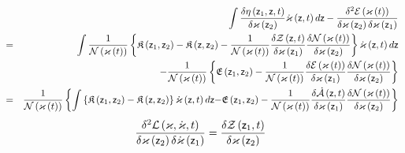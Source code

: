\begin{eqnarray}
&&\int \frac{\delta \eta \left( {\sf z}_{1},{\sf z},t\right) }{\delta
\varkappa \left( {\sf z}_{2}\right) }{\cal \dot{\varkappa}}\left( {\sf z}%
,t\right) d{\sf z}-\frac{\delta ^{2}{\cal E}\left( {\cal \varkappa }\left(
t\right) \right) }{\delta \varkappa \left( {\sf z}_{2}\right) \delta
\varkappa \left( {\sf z}_{1}\right) } \\
&=&\int \frac{1}{{\cal N}\left( {\cal \varkappa }\left( t\right) \right) }%
\left\{ {\frak K}\left( {\sf z}_{1},{\sf z}_{2}\right) -{\frak K}\left( {\sf %
z},{\sf z}_{2}\right) -\frac{1}{{\cal N}\left( {\cal \varkappa }\left(
t\right) \right) }\frac{\delta {\cal Z}\left( {\sf z},t\right) }{\delta
\varkappa \left( {\sf z}_{1}\right) }\frac{\delta {\cal N}\left( {\cal %
\varkappa }\left( t\right) \right) }{\delta \varkappa \left( {\sf z}%
_{2}\right) }\right\} {\cal \dot{\varkappa}}\left( {\sf z},t\right) d{\sf z}
\\
&&-\frac{1}{{\cal N}\left( {\cal \varkappa }\left( t\right) \right) }\left\{ 
{\frak E}\left( {\sf z}_{1},{\sf z}_{2}\right) -\frac{1}{{\cal N}\left( 
{\cal \varkappa }\left( t\right) \right) }\frac{\delta {\cal E}\left(
\varkappa \left( t\right) \right) }{\delta \varkappa \left( {\sf z}%
_{1}\right) }\frac{\delta {\cal N}\left( \varkappa \left( t\right) \right) }{%
\delta \varkappa \left( {\sf z}_{2}\right) }\right\} \\
&=&\frac{1}{{\cal N}\left( {\cal \varkappa }\left( t\right) \right) }\left\{
\int \left\{ {\frak K}\left( {\sf z}_{1},{\sf z}_{2}\right) -{\frak K}\left( 
{\sf z},{\sf z}_{2}\right) \right\} {\cal \dot{\varkappa}}\left( {\sf z}%
,t\right) d{\sf z-}{\frak E}\left( {\sf z}_{1},{\sf z}_{2}\right) -\frac{1}{%
{\cal N}\left( {\cal \varkappa }\left( t\right) \right) }\frac{\delta {\cal 
\dot{A}}\left( {\sf z},t\right) }{\delta \varkappa \left( {\sf z}_{1}\right) 
}\frac{\delta {\cal N}\left( {\cal \varkappa }\left( t\right) \right) }{%
\delta \varkappa \left( {\sf z}_{2}\right) }\right\}
\end{eqnarray}%
\begin{equation}
\frac{\delta ^{2}{\cal L}\left( \varkappa ,\dot{\varkappa},t\right) }{\delta
\varkappa \left( {\sf z}_{2}\right) \delta \dot{\varkappa}\left( {\sf z}%
_{1}\right) }=\frac{\delta {\cal Z}\left( {\sf z}_{1},t\right) }{\delta
\varkappa \left( {\sf z}_{2}\right) }
\end{equation}

\bigskip


